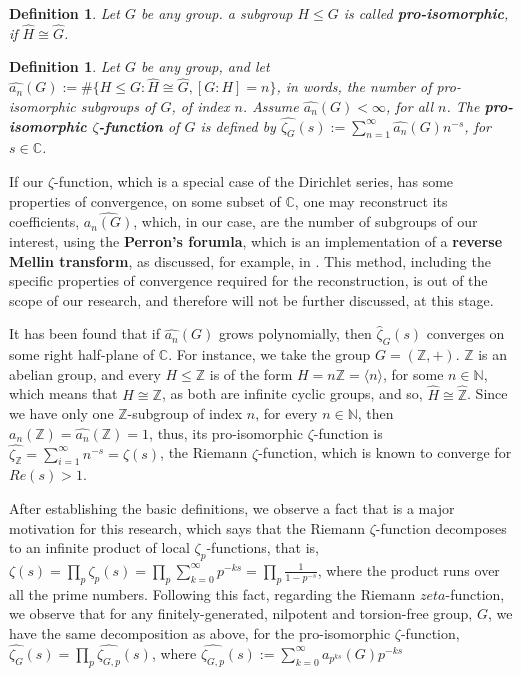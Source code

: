 \documentclass[12pt]{article}
\newtheorem{definition}[theorem]{Definition}
\begin{document}
\begin{definition}
\label{def:pro.isomorphic}
Let $G$ be any group. a subgroup $H\leq G$ is called \textbf{pro-isomorphic}, if $\widehat{H}\cong\widehat{G}$.
\end{definition}
\begin{definition}
\label{def:zeta.pro.isomorphic}
Let $G$ be any group, and let $\hat{a_n}(G):=\#\{H\leq G : \widehat{H}\cong\widehat{G}, [G:H]=n\}$, in words, the number of pro-isomorphic subgroups of $G$, of index $n$. Assume $\hat{a_n}(G)<\infty$, for all $n$. The \textbf{pro-isomorphic $\zeta$-function} of $G$ is defined by $\hat{\zeta_G}(s):=\sum_{n=1}^{\infty}\hat{a_n}(G)n^{-s}$, for $s\in\mathbb{C}$.
\end{definition}
If our $\zeta$-function, which is a special case of the Dirichlet series, has some properties of convergence, on some subset of $\mathbb{C}$, one may reconstruct its coefficients, $\hat{a_n(G)}$, which, in our case, are the number of subgroups of our interest, using the \textbf{Perron's forumla}, which is an implementation of a \textbf{reverse Mellin transform}, as discussed, for example, in \cite{MontgomeryVaughan}. This method, including the specific properties of convergence required for the reconstruction, is out of the scope of our research, and therefore will not be further discussed, at this stage.\par
It has been found that if $\hat{a_n}(G)$ grows polynomially, then $\hat{\zeta}_G(s)$ converges on some right half-plane of $\mathbb{C}$. For instance, we take the group $G=(\mathbb{Z},+)$. $\mathbb{Z}$ is an abelian group, and every $H\leq \mathbb{Z}$ is of the form $H=n\mathbb{Z}=\langle n\rangle$, for some $n\in\mathbb{N}$, which means that $H\cong \mathbb{Z}$, as both are infinite cyclic groups, and so, $\widehat{H}\cong\widehat{\mathbb{Z}}$. Since we have only one $\mathbb{Z}$-subgroup of index $n$, for every $n\in\mathbb{N}$, then $a_n(\mathbb{Z})=\hat{a_n}(\mathbb{Z})=1$, thus, its pro-isomorphic $\zeta$-function is $\hat{\zeta_{\mathbb{Z}}}=\sum_{i=1}^{\infty}n^{-s}=\zeta(s)$, the Riemann $\zeta$-function, which is known to converge for $Re(s)>1$.\par
After establishing the basic definitions, we observe a fact that is a major motivation for this research, which says that the Riemann $\zeta$-function decomposes to an infinite product of local $\zeta_p$-functions, that is, $\zeta(s)=\prod_p\zeta_p(s)=\prod_p\sum_{k=0}^\infty p^{-ks}=\prod_p\frac{1}{1-p^{-s}}$, where the product runs over all the prime numbers. Following this fact, regarding the Riemann $zeta$-function, we observe that for any finitely-generated, nilpotent and torsion-free group, $G$, we have the same decomposition as above, for the pro-isomorphic $\zeta$-function, $\hat{\zeta_G}(s)=\prod_p\hat{\zeta_{G,p}}(s)$, where $\hat{\zeta_{G,p}}(s):=\sum_{k=0}^\infty a_{p^{ks}}(G)p^{-ks}$
\end{document}

